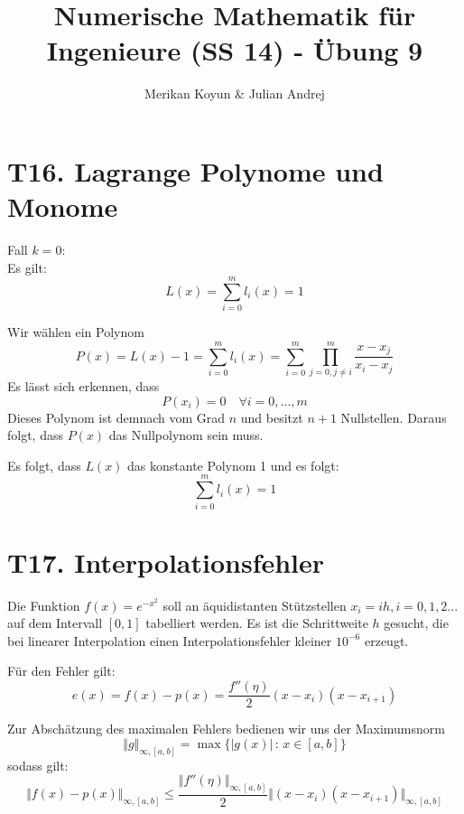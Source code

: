 \documentclass[11pt]{article}
\theoremstyle{plain}
\theoremstyle{definition}
\renewcommand{\a}{\"{a}}
\renewcommand{\u}{\"{u}}
\begin{document}
\title{Numerische Mathematik f\u r Ingenieure (SS 14) - \"{U}bung 9}
\author{Merikan Koyun \& Julian Andrej}
\maketitle

\section*{T16. Lagrange Polynome und Monome}

Fall $k=0$:\\
Es gilt:
\begin{equation}
L(x)=\sum_{i=0}^m l_i(x) = 1
\end{equation}

Wir w\a hlen ein Polynom
\begin{equation}
P(x) = L(x)-1 = \sum_{i=0}^m l_i(x) = \sum_{i=0}^m \prod_{j=0, j \neq i}^m \frac{x-x_j}{x_i-x_j}
\end{equation} 
Es l\a sst sich erkennen, dass
\begin{equation}
P(x_i)=0 \quad \forall i = 0,...,m
\end{equation}
Dieses Polynom ist demnach vom Grad $n$ und besitzt $n+1$ Nullstellen. Daraus folgt, dass $P(x)$ das Nullpolynom sein muss.

Es folgt, dass $L(x)$ das konstante Polynom 1 und es folgt:
\begin{equation}
\sum_{i=0}^m l_i(x) = 1
\end{equation}

\section*{T17. Interpolationsfehler}
Die Funktion $f(x)=e^{-x^2}$ soll an \a quidistanten St\u tzstellen $x_i = ih, i=0,1,2...$ auf dem Intervall $[0,1]$ tabelliert werden. Es ist die Schrittweite $h$ gesucht, die bei linearer Interpolation einen Interpolationsfehler kleiner $10^{-6}$ erzeugt.\vspace{0.3cm}

F\u r den Fehler gilt:
\begin{equation}
e(x) = f(x)-p(x) = \frac{f''(\eta)}{2}(x-x_i)(x-x_{i+1})
\end{equation}

Zur Absch\a tzung des maximalen Fehlers bedienen wir uns der Maximumsnorm
\begin{equation}
\Vert g \Vert_{\infty, [a,b]} = \max\{|g(x)| \, : \, x\in [a,b]\}
\end{equation}
sodass gilt:
\begin{equation}
\Vert f(x)-p(x)\Vert_{\infty, [a,b]} \leq \frac{\Vert f''(\eta) \Vert_{\infty, [a,b]}}{2}\Vert(x-x_i)(x-x_{i+1})\Vert_{\infty, [a,b]}
\end{equation}
\end{document}
